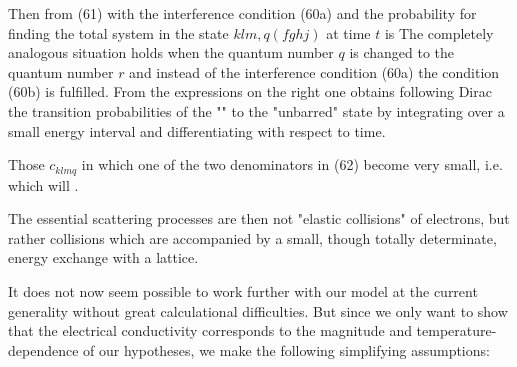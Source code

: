 \begin{paper}{1}
Then from (61) with the interference condition (60a)
and the probability for finding the total system in the state $klm,q(fghj)$ at time $t$ is
The completely analogous situation holds when the quantum number $q$ is changed to the quantum number $r$ and instead of the interference condition (60a) the condition (60b) is fulfilled. From the expressions on the right one obtains following Dirac the transition probabilities of the "" to the "unbarred" state by integrating over a small energy interval and differentiating with respect to time.

Those $c_{klmq}$ in which one of the two denominators in (62) become very small, i.e. which 
will .

The essential scattering processes are then not "elastic collisions" of electrons, but rather collisions which are accompanied by a small, though totally determinate, energy exchange with a lattice.

It does not now seem possible to work further with our model at the current generality without great calculational difficulties. But since we only want to show that the electrical conductivity corresponds to the magnitude and temperature-dependence of our hypotheses, we make the following simplifying assumptions:


\end{paper}
